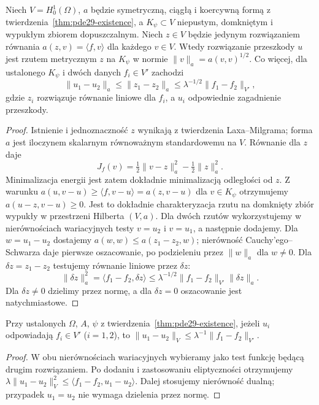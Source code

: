 \begin{stwierdzenie}
\label{prop:pde-v44-obstacle-projection}
Niech $V=H_0^1(\Omega)$, $a$ będzie symetryczną,
ciągłą i koercywną formą z twierdzenia~\ref{thm:pde29-existence},
a $K_\psi\subset V$ niepustym, domkniętym i wypukłym
zbiorem dopuszczalnym. Niech $z\in V$ będzie jedynym
rozwiązaniem równania $a(z,v)=\langle f,v\rangle$ dla
każdego $v\in V$. Wtedy rozwiązanie przeszkody $u$
jest rzutem metrycznym $z$ na $K_\psi$ w normie
$\|v\|_a=a(v,v)^{1/2}$. Co więcej, dla ustalonego
$K_\psi$ i dwóch danych $f_i\in V'$ zachodzi
\begin{equation}\label{eq:pde-v44-projection-nonexpansive}
 \|u_1-u_2\|_a\le \|z_1-z_2\|_a
 \le\lambda^{-1/2}\|f_1-f_2\|_{V'},
\end{equation}
gdzie $z_i$ rozwiązuje równanie liniowe dla $f_i$,
a $u_i$ odpowiednie zagadnienie przeszkody.
\end{stwierdzenie}
\begin{proof}
Istnienie i jednoznaczność $z$ wynikają z twierdzenia Laxa--Milgrama;
forma $a$ jest iloczynem skalarnym równoważnym
standardowemu na $V$. Równanie dla $z$ daje
\[
 J_f(v)=\tfrac12\|v-z\|_a^2-\tfrac12\|z\|_a^2.
\]
Minimalizacja energii jest zatem dokładnie
minimalizacją odległości od $z$. Z warunku
$a(u,v-u)\ge\langle f,v-u\rangle=a(z,v-u)$
dla $v\in K_\psi$ otrzymujemy
$a(u-z,v-u)\ge0$. Jest to dokładnie
charakteryzacja rzutu na domknięty zbiór wypukły
w przestrzeni Hilberta $(V,a)$.
Dla dwóch rzutów wykorzystujemy w nierównościach
wariacyjnych testy $v=u_2$ i $v=u_1$, a następnie
dodajemy. Dla $w=u_1-u_2$ dostajemy
$a(w,w)\le a(z_1-z_2,w)$; nierówność Cauchy'ego--Schwarza
daje pierwsze oszacowanie, po podzieleniu
przez $\|w\|_a$ dla $w\ne0$.
Dla $\delta z=z_1-z_2$ testujemy równanie
liniowe przez $\delta z$:
\[
 \|\delta z\|_a^2=\langle f_1-f_2,\delta z\rangle
 \le\lambda^{-1/2}\|f_1-f_2\|_{V'}\|\delta z\|_a.
\]
Dla $\delta z\ne0$ dzielimy przez normę, a dla
$\delta z=0$ oszacowanie jest natychmiastowe.
\end{proof}


\begin{stwierdzenie}
\label{prop:pde29-stable}
Przy ustalonych $\Omega$, $A$, $\psi$ z
 twierdzenia~\ref{thm:pde29-existence}, jeżeli $u_i$ odpowiadają
$f_i\in V'$ ($i=1,2$), to
$\|u_1-u_2\|_V\le\lambda^{-1}\|f_1-f_2\|_{V'}$.
\end{stwierdzenie}
\begin{proof}
W obu nierównościach wariacyjnych wybieramy jako test funkcję
będącą drugim rozwiązaniem. Po dodaniu i zastosowaniu
eliptyczności otrzymujemy
$\lambda\|u_1-u_2\|_V^2\le
\langle f_1-f_2,u_1-u_2\rangle$.
Dalej stosujemy nierówność dualną; przypadek $u_1=u_2$
nie wymaga dzielenia przez normę.
\end{proof}

